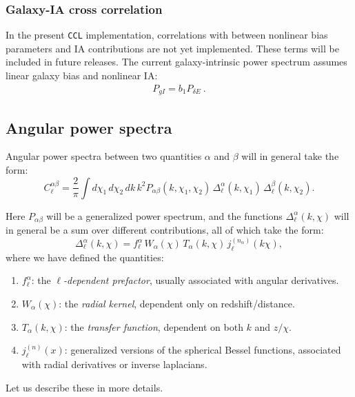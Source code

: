 \documentclass[\docopts]{\docclass}
\newcommand{\ccl}{{\tt CCL}\xspace}
\begin{document}
\subsubsection{Galaxy-IA cross correlation}

In the present \ccl implementation, correlations with between nonlinear bias parameters and IA contributions are not yet implemented. These terms will be included in future releases. The current galaxy-intrinsic power spectrum assumes linear galaxy bias and nonlinear IA:
\begin{align}
    P_{gI} = b_1 P_{\delta E}~.
\end{align}

\subsection{Angular power spectra}
\label{sec:cl}

Angular power spectra between two quantities $\alpha$ and $\beta$ will in general take the form:
\begin{equation}
  C^{\alpha\beta}_\ell=\frac{2}{\pi}\int d\chi_1\,d\chi_2\,dk\,k^2 P_{\alpha\beta}(k,\chi_1,\chi_2)\,\Delta^\alpha_\ell(k,\chi_1)\,\Delta^\beta_\ell(k,\chi_2).
\end{equation}

Here $P_{\alpha\beta}$ will be a generalized power spectrum, and the functions $\Delta^\alpha_\ell(k,\chi)$ will in general be a sum over
different contributions, all of which take the form:
\begin{equation}\label{eq:generalized_tracer}
  \Delta^\alpha_\ell(k,\chi)=f^\alpha_\ell\,W_\alpha(\chi)\,T_\alpha(k,\chi)\,j^{(n_\alpha)}_\ell(k\chi),
\end{equation}
where we have defined the quantities:
\begin{enumerate}
 \item $f^\alpha_\ell$: the \emph{$\ell$-dependent prefactor}, usually associated with angular derivatives.
 \item $W_\alpha(\chi)$: the \emph{radial kernel}, dependent only on redshift/distance.
 \item $T_\alpha(k,\chi)$: the \emph{transfer function}, dependent on both $k$ and $z/\chi$.
 \item $j^{(n)}_\ell(x)$: generalized versions of the spherical Bessel functions, associated with radial derivatives or inverse laplacians.
\end{enumerate}
Let us describe these in more details.
\end{document}
